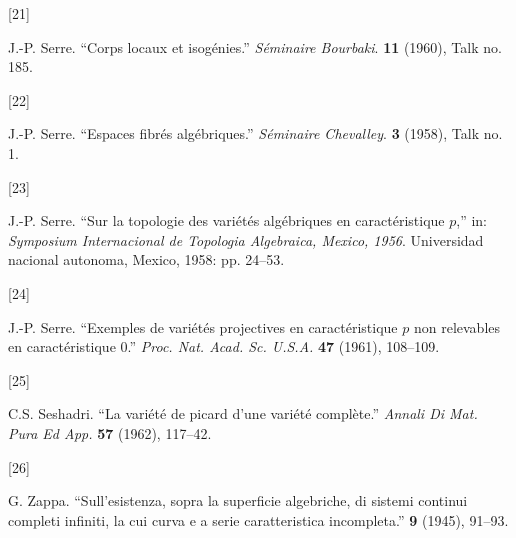 \documentclass{article}
\newlength{\cslhangindent}
\newlength{\csllabelwidth}
\newenvironment{CSLReferences}[2] %
 {%
  \setlength{\parindent}{0pt}
  \ifodd #1 \everypar{\setlength{\hangindent}{\cslhangindent}}\ignorespaces\fi
  \setlength{\parskip}{0.75\baselineskip}
 }%
 {}
\newcommand{\CSLLeftMargin}[1]{\parbox[t]{\maxof{\widthof{#1}}{\csllabelwidth}}{#1}}
\newcommand{\CSLRightInline}[1]{\parbox[t]{\linewidth}{#1}}
\theoremstyle{definition}
\theoremstyle{definition}
\theoremstyle{definition}
\theoremstyle{definition}
\theoremstyle{remark}
\begin{document}
\begin{CSLReferences}{0}{0}
\leavevmode{}%
\CSLLeftMargin{{[}21{]} }%
\CSLRightInline{J.-P. Serre. {``Corps locaux et isogénies.''} \emph{Séminaire Bourbaki}. \textbf{11} (1960), Talk no. 185.}

\leavevmode{}%
\CSLLeftMargin{{[}22{]} }%
\CSLRightInline{J.-P. Serre. {``Espaces fibrés algébriques.''} \emph{Séminaire Chevalley}. \textbf{3} (1958), Talk no. 1.}

\leavevmode{}%
\CSLLeftMargin{{[}23{]} }%
\CSLRightInline{J.-P. Serre. {``Sur la topologie des variétés algébriques en caractéristique \(p\),''} in: \emph{Symposium Internacional de Topologia Algebraica, {Mexico}, 1956}. {Universidad nacional autonoma, Mexico}, 1958: pp. 24--53.}

\leavevmode{}%
\CSLLeftMargin{{[}24{]} }%
\CSLRightInline{J.-P. Serre. {``Exemples de variétés projectives en caractéristique \(p\) non relevables en caractéristique 0.''} \emph{Proc. Nat. Acad. Sc. U.S.A.} \textbf{47} (1961), 108--109.}

\leavevmode{}%
\CSLLeftMargin{{[}25{]} }%
\CSLRightInline{C.S. Seshadri. {``La variété de picard d'une variété complète.''} \emph{Annali Di Mat. Pura Ed App.} \textbf{57} (1962), 117--42.}

\leavevmode{}%
\CSLLeftMargin{{[}26{]} }%
\CSLRightInline{G. Zappa. {``Sull'esistenza, sopra la superficie algebriche, di sistemi continui completi infiniti, la cui curva e a serie caratteristica incompleta.''} \textbf{9} (1945), 91--93.}

\end{CSLReferences}
\end{document}
